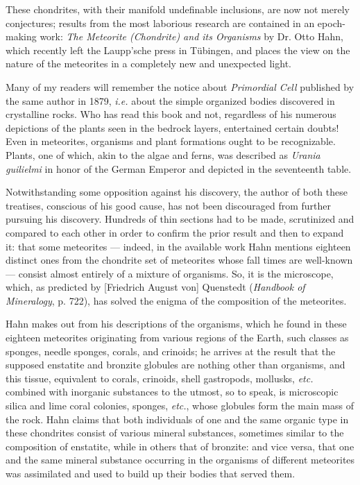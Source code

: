 \documentclass[a4paper, 12pt, oneside]{article}
\begin{document}
These chondrites, with their manifold undefinable inclusions, are now not merely conjectures; results from the most laborious research are contained in an epoch-making work: \emph{The Meteorite (Chondrite) and its Organisms} by Dr. Otto Hahn, which recently left the Laupp'sche press in Tübingen, and places the view on the nature of the meteorites in a completely new and unexpected light.

Many of my readers will remember the notice about \emph{Primordial Cell} published by the same author in 1879, \emph{i.e.} about the simple organized bodies discovered in crystalline rocks. Who has read this book and not, regardless of his numerous depictions of the plants seen in the bedrock layers, entertained certain doubts! Even in meteorites, organisms and plant formations ought to be recognizable. Plants, one of which, akin to the algae and ferns, was described as \emph{Urania guilielmi} in honor of the German Emperor and depicted in the seventeenth table.

Notwithstanding some opposition against his discovery, the author of both these treatises, conscious of his good cause, has not been discouraged from further pursuing his discovery. Hundreds of thin sections had to be made, scrutinized and compared to each other in order to confirm the prior result and then to expand it: that some meteorites --- indeed, in the available work Hahn mentions eighteen distinct ones from the chondrite set of meteorites whose fall times are well-known --- consist almost entirely of a mixture of organisms. So, it is the microscope, which, as predicted by [Friedrich August von] Quenstedt (\emph{Handbook of Mineralogy}, p. 722), has solved the enigma of the composition of the meteorites.

Hahn makes out from his descriptions of the organisms, which he found in these eighteen meteorites originating from various regions of the Earth, such classes as sponges, needle sponges, corals, and crinoids; he arrives at the result that the supposed enstatite and bronzite globules are nothing other than organisms, and this tissue, equivalent to corals, crinoids, shell gastropods, mollusks, \emph{etc.} combined with inorganic substances to the utmost, so to speak, is microscopic silica and lime coral colonies, sponges, \emph{etc.}, whose globules form the main mass of the rock. Hahn claims that both individuals of one and the same organic type in these chondrites consist of various mineral substances, sometimes similar to the composition of enstatite, while in others that of bronzite: and vice versa, that one and the same mineral substance occurring in the organisms of different meteorites was assimilated and used to build up their bodies that served them.
\end{document}
